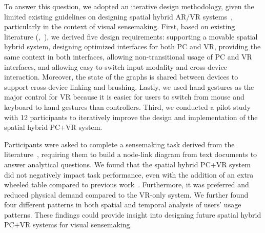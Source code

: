To answer this question, we adopted an iterative design methodology, given the limited existing guidelines on designing spatial hybrid AR/VR systems~\cite{krauss2021current}, particularly in the context of visual sensemaking.
First, based on existing literature (\eg{},~\cite{lisle2020evaluating,hubenschmid2021towards,davidson2022exploring,tong2023towards}), we derived five design requirements: supporting a movable spatial hybrid system, designing optimized interfaces for both PC and VR, providing the same context in both interfaces, allowing non-transitional usage of PC and VR interfaces, and allowing easy-to-switch input modality and cross-device interaction.
Moreover, the state of the graphs is shared between devices to support cross-device linking and brushing. Lastly, we used hand gestures as the major control for VR because it is easier for users to switch from mouse and keyboard to hand gestures than controllers. Third, we conducted a pilot study with 12 participants to iteratively improve the design and implementation of the spatial hybrid PC+VR system.


Participants were asked to complete a sensemaking task derived from the literature~\cite{mahyar2014supporting,balakrishnan2008visualizations,tong2023towards,yang2024putting}, requiring them to build a node-link diagram from text documents to answer analytical questions.
We found that the spatial hybrid PC+VR system did not negatively impact task performance, even with the addition of an extra wheeled table compared to previous work~\cite{pavanatto2021we}. Furthermore, it was preferred and reduced physical demand compared to the VR-only system.
We further found four different patterns in both spatial and temporal analysis of users' usage patterns. These findings could provide insight into designing future spatial hybrid PC+VR systems for visual sensemaking.

